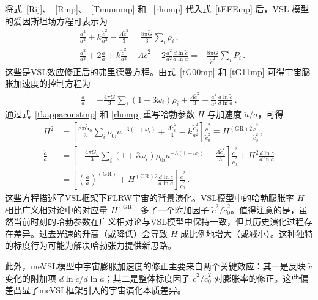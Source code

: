\documentclass[jkps,preprint,fleqn]{revtex4}
\newcommand{\tc}{\tilde{c}}
\newcommand{\tG}{\tilde{G}}
\newcommand{\GR}{\text{GR}}
\begin{document}
\begin{CJK*}{UTF8}{gbsn}
将式~\eqref{Rij}、~\eqref{Rmp}、~\eqref{Tmunump} 和 ~\eqref{rhomp} 代入式~\eqref{tEFEmp} 后，VSL 模型的爱因斯坦场方程可表示为
\begin{align}
 &\frac{\dot{a}^2}{a^2} + k \frac{\tc^2}{a^2}  -\frac{ \Lambda \tc^2}{3} = \frac{8 \pi \tG}{3} \sum_i \rho_i \label{tG00mp} \,, \\
 &\frac{\dot{a}^2}{a^2} + 2 \frac{\ddot{a}}{a} +  k \frac{\tc^2}{a^2} - \Lambda \tc^2 - 2 \frac{\dot{a}^2}{a^2} \frac{d \ln \tc}{d \ln a} = -\frac{8 \pi \tG}{\tc^2} \sum_{i} P_i  \label{tG11mp} \,.
 \end{align}
这些是VSL效应修正后的弗里德曼方程。由式~\eqref{tG00mp} 和 \eqref{tG11mp} 可得宇宙膨胀加速度的控制方程为
\begin{align}
 \frac{\ddot{a}}{a} = -\frac{4\pi \tG}{3} \sum_i \left( 1 + 3 \omega_i \right) \rho_i  + \frac{\Lambda \tc^2}{3} + \frac{\dot{a}^2}{a^2} \frac{d \ln \tc}{d \ln a} \label{t3G11mG00mp} \,.
 \end{align}
通过式~\eqref{tkappaconstmp} 和 \eqref{rhomp} 重写哈勃参数 $H$ 与加速度 $\ddot{a}/a$，可得
\begin{align}
 H^2 &= \left[ \frac{8 \pi \tG_0}{3} \sum_{i} \rho_{0i} a^{-3(1+\omega_i)} + \frac{ \Lambda \tc_0^2}{3} - k \frac{\tc_0^2}{a^2} \right] \frac{\tc^2}{\tc_0^2} \equiv H^{(\GR)2} \frac{\tc^2}{\tc_0^2} \label{H2me} \,, \\
 \frac{\ddot{a}}{a} &= \left[ -\frac{4\pi \tG_0}{3} \sum_i \left( 1 + 3 \omega_i \right) \rho_{0i} a^{-3(1+\omega_i)} + \frac{\Lambda \tc_0^2}{3} \right] \frac{\tc^2}{\tc_0^2} + H^2 \frac{d \ln \tc}{d \ln a} \nonumber \\
 &= \left[ \left( \frac{\ddot{a}}{a} \right)^{(\GR)} +  H^{(\GR)2} \frac{d \ln \tc}{d \ln a}  \right] \frac{\tc^2}{\tc_0^2} \label{ddotaoa} \,.
 \end{align}
这些方程描述了VSL框架下FLRW宇宙的背景演化。VSL模型中的哈勃膨胀率 $H$ 相比广义相对论中的对应量 $H^{(\GR)}$ 多了一个附加因子 $\tc^2/\tc_0^2$。值得注意的是，虽然当前时刻的哈勃参数在广义相对论与VSL模型中保持一致，但其历史演化过程存在差异。过去光速的升高（或降低）会导致 $H$ 成比例地增大（或减小）。这种独特的标度行为可能为解决哈勃张力提供新思路。

此外，meVSL模型中宇宙膨胀加速度的修正主要来自两个关键效应：其一是反映 $\tc$ 变化的附加项 $d \ln \tc/d \ln a$；其二是整体标度因子 $\tc^2/\tc_0^2$ 对膨胀率的修正。这些偏差凸显了meVSL框架引入的宇宙演化本质差异。


\end{CJK*}
\end{document}
